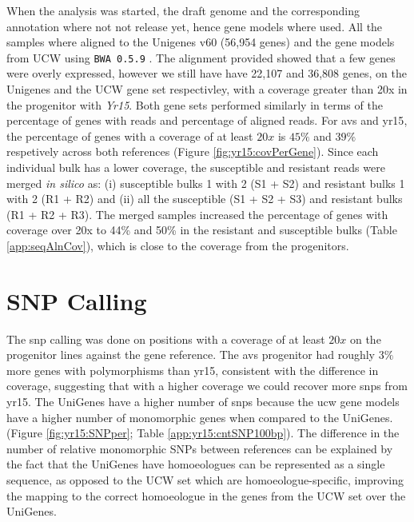 When the analysis was started, the draft genome and the corresponding annotation where not not release yet, hence gene models where used. 
All the samples where aligned to the Unigenes v60 (56,954 genes) and the gene models from UCW \citep{Krasileva2013} using \verb|BWA 0.5.9| \citep{Li2009}. 
The alignment provided showed that a few genes were overly expressed, however we still have have 22,107 and 36,808 genes, on the Unigenes and the UCW gene set respectivley,  with a coverage greater than 20x in the progenitor with \textit{Yr15}. 
Both gene sets performed similarly in terms of the percentage of genes with reads and percentage of aligned reads. 
For \gls{avs} and \gls{yr15}, the percentage of genes with a coverage of at least $20x$ is $45\%$ and $39\%$ respetively across both references (Figure \ref{fig:yr15:covPerGene}).
Since each individual bulk has a lower coverage, the susceptible and resistant reads were merged \textit{in silico} as: (i) susceptible bulks 1 with 2 (S1 + S2) and resistant bulks 1 with 2 (R1 + R2) and (ii) all the susceptible (S1 + S2 + S3) and resistant bulks (R1 + R2 + R3). 
The merged samples increased the percentage of genes with coverage over 20x  to 44\% and 50\% in the resistant and susceptible bulks (Table \ref{app:seqAlnCov}), which is close to the coverage from the progenitors.

\section{SNP Calling}
\label{yr15:snpCalling}

The \acrshort{snp} calling was done on positions with a coverage of at least $20x$ on the progenitor lines against the gene reference. The \acrshort{avs} progenitor had roughly $3\%$ more genes with polymorphisms than \acrshort{yr15}, consistent with the difference in coverage, suggesting that with a higher coverage we could recover more \acrshort{snp}s from \acrshort{yr15}.
The UniGenes have a higher number of \acrshort{snp}s because the \acrshort{ucw} gene models have a higher number of monomorphic genes when compared to the UniGenes. (Figure {\ref{fig:yr15:SNPper}}; Table \ref{app:yr15:cntSNP100bp}). 
The difference in the number of relative monomorphic SNPs between references can be explained by the fact that the UniGenes have homoeologues can be represented as a single sequence, as opposed to the UCW set which are homoeologue-specific, improving the mapping to the correct homoeologue in the genes from the UCW set over the UniGenes.

